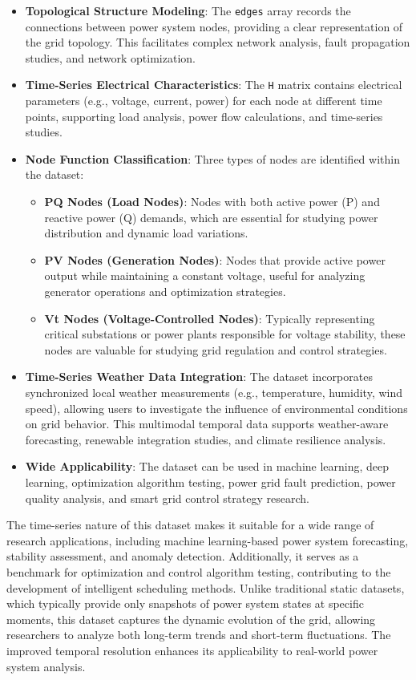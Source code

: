 \documentclass[12pt]{article}
\begin{document}
\begin{itemize}
    \item \textbf{\small Topological Structure Modeling}: The \texttt{edges} array records the connections between power system nodes, providing a clear representation of the grid topology. This facilitates complex network analysis, fault propagation studies, and network optimization.  
    \item \textbf{\small Time-Series Electrical Characteristics}: The \texttt{H} matrix contains electrical parameters (e.g., voltage, current, power) for each node at different time points, supporting load analysis, power flow calculations, and time-series studies.  
    \item \textbf{\small Node Function Classification}: Three types of nodes are identified within the dataset:
    \begin{itemize}
        \item \textbf{\small PQ Nodes (Load Nodes)}: Nodes with both active power (P) and reactive power (Q) demands, which are essential for studying power distribution and dynamic load variations.  
        \item \textbf{\small PV Nodes (Generation Nodes)}: Nodes that provide active power output while maintaining a constant voltage, useful for analyzing generator operations and optimization strategies.  
        \item \textbf{\small Vt Nodes (Voltage-Controlled Nodes)}: Typically representing critical substations or power plants responsible for voltage stability, these nodes are valuable for studying grid regulation and control strategies.  
    \end{itemize}
    \item \textbf{\small Time-Series Weather Data Integration}: The dataset incorporates synchronized local weather measurements (e.g., temperature, humidity, wind speed), allowing users to investigate the influence of environmental conditions on grid behavior. This multimodal temporal data supports weather-aware forecasting, renewable integration studies, and climate resilience analysis.
    \item \textbf{\small Wide Applicability}: The dataset can be used in machine learning, deep learning, optimization algorithm testing, power grid fault prediction, power quality analysis, and smart grid control strategy research.  
\end{itemize}

The time-series nature of this dataset makes it suitable for a wide range of research applications,
including machine learning-based power system forecasting, stability assessment, and anomaly detection.
Additionally, it serves as a benchmark for optimization and control algorithm testing, contributing to the development of intelligent scheduling methods.
Unlike traditional static datasets, which typically provide only snapshots of power system states at specific moments, this dataset captures the dynamic evolution of
the grid, allowing researchers to analyze both long-term trends and short-term fluctuations. The improved temporal resolution enhances its applicability to real-world
power system analysis.  
\end{document}

